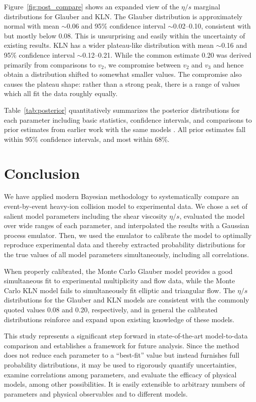 \documentclass[aps,prc,reprint,superscriptaddress,amsmath]{revtex4-1}
\begin{document}
Figure~\ref{fig:post_compare} shows an expanded view of the $\eta/s$ marginal distributions for Glauber and KLN.
The Glauber distribution is approximately normal with mean ${\sim}$0.06 and 95\% confidence interval ${\sim}$0.02--0.10, consistent with but mostly below 0.08.
This is unsurprising and easily within the uncertainty of existing results.
KLN has a wider plateau-like distribution with mean ${\sim}$0.16 and 95\% confidence interval ${\sim}$0.12--0.21.
While the common estimate 0.20 was derived primarily from comparisons to $v_2$, we compromise between $v_2$ and $v_3$ and hence obtain a distribution shifted to somewhat smaller values.
The compromise also causes the plateau shape: rather than a strong peak, there is a range of values which all fit the data roughly equally.

Table~\ref{tab:posterior} quantitatively summarizes the posterior distributions for each parameter including basic statistics, confidence intervals, and comparisons to prior estimates from earlier work with the same models \cite{Shen:2011zc,Heinz:2011kt,Shen:2013pc}.
All prior estimates fall within 95\% confidence intervals, and most within 68\%.



\section{Conclusion}

We have applied modern Bayesian methodology to systematically compare an event-by-event heavy-ion collision model to experimental data.
We chose a set of salient model parameters including the shear viscosity $\eta/s$, evaluated the model over wide ranges of each parameter, and interpolated the results with a Gaussian process emulator.
Then, we used the emulator to calibrate the model to optimally reproduce experimental data and thereby extracted probability distributions for the true values of all model parameters simultaneously, including all correlations.

When properly calibrated, the Monte Carlo Glauber model provides a good simultaneous fit to experimental multiplicity and flow data, while the Monte Carlo KLN model fails to simultaneously fit elliptic and triangular flow.
The $\eta/s$ distributions for the Glauber and KLN models are consistent with the commonly quoted values 0.08 and 0.20, respectively, and in general the calibrated distributions reinforce and expand upon existing knowledge of these models.

This study represents a significant step forward in state-of-the-art model-to-data comparison and establishes a framework for future analysis.
Since the method does not reduce each parameter to a ``best-fit'' value but instead furnishes full probability distributions, it may be used to rigorously quantify uncertainties, examine correlations among parameters, and evaluate the efficacy of physical models, among other possibilities.
It is easily extensible to arbitrary numbers of parameters and physical observables and to different models.
\end{document}
